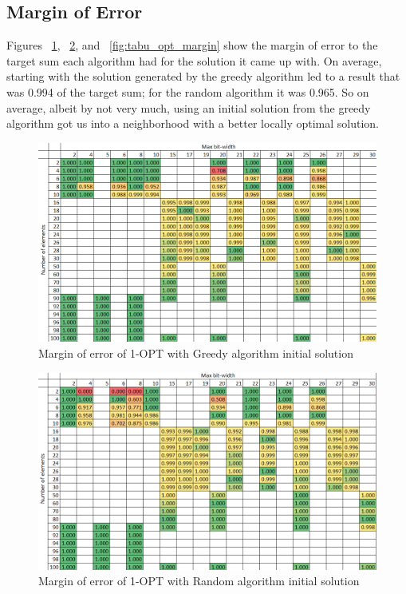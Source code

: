 \documentclass{report}
\begin{document}
\subsection{Margin of Error}
Figures ~\ref{fig:greedy_opt_margin}, ~\ref{fig:random_opt_margin}, and ~\ref{fig:tabu_opt_margin} show the margin
of error to the target sum each algorithm had for the solution it came up with. On average, starting with the solution
generated by the greedy algorithm led to a result that was 0.994 of the target sum; for the random algorithm it was 0.965.
So on average, albeit by not very much, using an initial solution from the greedy algorithm got us into a neighborhood with
a better locally optimal solution. 

\begin{figure}[h]
  \centering
  \includegraphics[width=12cm]{p5_greedy_margin.png}
  \caption{Margin of error of 1-OPT with Greedy algorithm initial solution}
  \label{fig:greedy_opt_margin}
\end{figure}

\begin{figure}[h]
  \centering
  \includegraphics[width=12cm]{p5_random_margin.png}
  \caption{Margin of error of 1-OPT with Random algorithm initial solution}
  \label{fig:random_opt_margin}
\end{figure}
\end{document}
